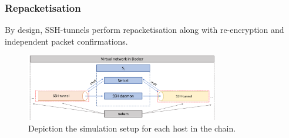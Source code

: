 \documentclass[runningheads,11pt]{llncs}\usepackage[]{graphicx}\usepackage[]{color}
\begin{document}
\vspace{-0.6cm}
\subsubsection{Repacketisation}%


By design, SSH-tunnels perform repacketisation along with re-encryption and independent packet confirmations.


\begin{figure}
\centering
\includegraphics[width=0.75\textwidth]{images/Docker_framework.png}
\caption{Depiction the simulation setup for each host in the chain.}\label{Fig:Simulation_setup}
\vspace{-0.6cm}
\end{figure}



 
\end{document}
